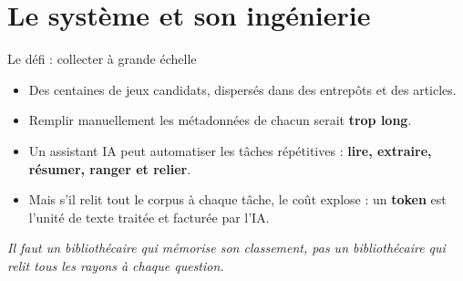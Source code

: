 \documentclass[aspectratio=169,11pt]{beamer}
\begin{document}
\section{Le système et son ingénierie}
\begin{frame}{Le défi : collecter à grande échelle}
\begin{itemize}
    \item Des centaines de jeux candidats, dispersés dans des entrepôts et des articles.
    \vspace{0.2cm}
    \item Remplir manuellement les métadonnées de chacun serait \textbf{trop long}.
    \vspace{0.2cm}
    \item Un assistant IA peut automatiser les tâches répétitives :
    \textbf{lire, extraire, résumer, ranger et relier}.
    \vspace{0.2cm}
    \item Mais s'il relit tout le corpus à chaque tâche, le coût explose :
    un \textbf{token} est l'unité de texte traitée et facturée par l'IA.
\end{itemize}
\vspace{0.3cm}
\centering\emph{Il faut un bibliothécaire qui mémorise son classement,
pas un bibliothécaire qui relit tous les rayons à chaque question.}
\end{frame}
\end{document}
